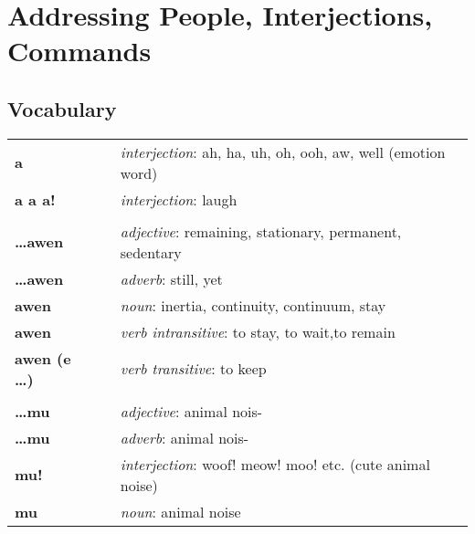 
\section{Addressing People, Interjections, Commands}
\subsection*{Vocabulary}

\begin{supertabular}{p{2,5cm}|ll}
    \textbf{a}               &  & \textit{interjection}: ah, ha, uh, oh, ooh, aw, well (emotion word)                 \\
    \textbf{a a a!}          &  & \textit{interjection}: laugh                                                        \\
                             &  &                                                                                     \\
    \textbf{\dots awen}      &  & \textit{adjective}: remaining, stationary, permanent, sedentary                     \\
    \textbf{\dots awen}      &  & \textit{adverb}: still, yet                                                         \\
    \textbf{awen}            &  & \textit{noun}: inertia, continuity, continuum, stay                                 \\
    \textbf{awen}            &  & \textit{verb intransitive}: to stay, to wait,to remain                              \\
    \textbf{awen (e \dots)}  &  & \textit{verb transitive}: to keep                                                   \\
                             &  &                                                                                     \\
    \textbf{\dots mu}        &  & \textit{adjective}: animal nois-                                                    \\
    \textbf{\dots mu}        &  & \textit{adverb}: animal nois-                                                       \\
    \textbf{mu!}             &  & \textit{interjection}: woof! meow! moo! etc. (cute animal noise)                    \\
    \textbf{mu}              &  & \textit{noun}: animal noise                                                         \\

\end{supertabular}
